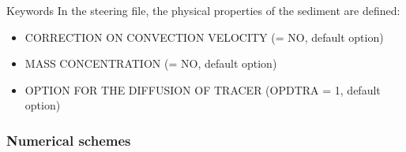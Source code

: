 \medskip
\begin{bclogo}[couleur=blue!10,arrondi=0.1, logo=\bcinfo]{Keywords}
In the \sisyphe steering file, the physical properties of the sediment are
defined:
\begin{itemize}
\item {\ttfamily CORRECTION ON CONVECTION VELOCITY} ({\ttfamily = NO}, default option)
\item {\ttfamily MASS CONCENTRATION} ({\ttfamily = NO}, default option)
\item {\ttfamily OPTION FOR THE DIFFUSION OF TRACER} ({\ttfamily OPDTRA = 1}, default option)
\end{itemize}
\end{bclogo}

\subsubsection{Numerical schemes}

